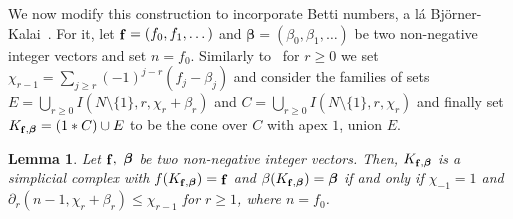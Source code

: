 \documentclass[reqno,english]{amsart}
\newtheorem{lemma}[theorem]{Lemma}
\numberwithin{claimcounter}{theorem}
\theoremstyle{remark}
\theoremstyle{definition}
\numberwithin{theorem}{section}
\DeclareMathOperator{\fvec}{\bf f}
\newcommand{\bbeta}{\boldsymbol{\beta}}
\begin{document}
We now modify this construction to incorporate Betti numbers, a l\'a  Bj\"{o}rner-Kalai~\cite{Bjorner-Kalai-ACTA}.
For it, let $\fvec=(f_0,f_1,\dots)$ and $\bbeta=(\beta_0,\beta_1,\dots)$ be two non-negative integer vectors and set $n=f_0$.
Similarly to~\cite{Bjorner-Kalai-ACTA} for $r\geq 0$ we set $\chi_{r-1}=\sum_{j\geq r}(-1)^{j-r}(f_j-\beta_j)$
and consider the families of sets $E = \bigcup_{r\geq 0} I(N\setminus \{1\},r,\chi_r+\beta_r)$ and
$C=\bigcup_{r\geq 0}I(N\setminus \{1\},r,\chi_r)$ and finally set $K_{\fvec,\bbeta} = (1*C)\cup E$
to be the cone over $C$ with apex $1$, union $E$. 

\begin{lemma}
\label{l:homlexsegment}
Let $\fvec,~\bbeta$ be two non-negative integer vectors.
Then, $K_{\fvec, \bbeta}$ is a simplicial complex with $f(K_{\fvec,\bbeta}) = \fvec$ and $\beta (K_{\fvec,\bbeta}) = \bbeta$
if and only if $\chi_{-1}=1$ and $\partial_r (n-1,\chi_r + \beta_r) \leq \chi_{r-1}$ for $r\geq 1$, where $n=f_0$. 
\end{lemma}
\end{document}
